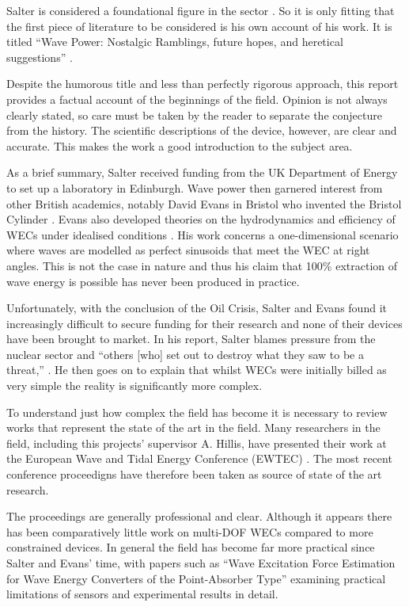 \documentclass{report}
\begin{document}
Salter is considered a foundational figure in the sector \cite{gorinevsky2005a}. So it is only fitting that the first piece of literature to be considered is his own account of his work. It is titled ``Wave Power: Nostalgic Ramblings, future hopes, and heretical suggestions'' \cite{salterRamble}.

Despite the humorous title and less than perfectly rigorous approach, this report provides a factual account of the beginnings of the field. Opinion is not always clearly stated, so care must be taken by the reader to separate the conjecture from the history. The scientific descriptions of the device, however, are clear and accurate. This makes the work a good introduction to the subject area. 

As a brief summary, Salter received funding from the UK Department of Energy to set up a laboratory in Edinburgh. Wave power then garnered interest from other British academics, notably David Evans in Bristol who invented the Bristol Cylinder \cite{evans1979a}. Evans also developed theories on the hydrodynamics and efficiency of WECs under idealised conditions \cite{evans1976a}. His work concerns a one-dimensional scenario where waves are modelled as perfect sinusoids that meet the WEC at right angles. This is not the case in nature and thus his claim that 100\% extraction of wave energy is possible has never been produced in practice.

Unfortunately, with the conclusion of the Oil Crisis, Salter and Evans found it increasingly difficult to secure funding for their research and none of their devices have been brought to market. In his report, Salter blames pressure from the nuclear sector and ``others [who] set out to destroy what they saw to be a threat,'' \cite{salterRamble}. He then goes on to explain that whilst WECs were initially billed as very simple the reality is significantly more complex.

To understand just how complex the field has become it is necessary to review works that represent the state of the art in the field. Many researchers in the field, including this projects' supervisor A. Hillis, have presented their work at the European Wave and Tidal Energy Conference (EWTEC) \cite{andyMPC}\cite{andyModelErrors}\cite{nguyen2018a}\cite{abdelkhalik2017a}. The most recent conference proceedigns have therefore been taken as source of state of the art research\cite{EWTEC}.

The proceedings are generally professional and clear. Although it appears there has been comparatively little work on multi-DOF WECs compared to more constrained devices. In general the field has become far more practical since Salter and Evans' time, with papers such as ``Wave Excitation Force Estimation for Wave Energy Converters of the Point-Absorber Type'' \cite{nguyen2018a} examining practical limitations of sensors and experimental results in detail.
\end{document}
